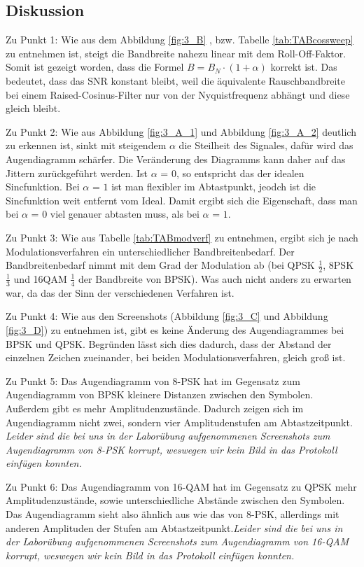\documentclass[12pt,a4paper,ngerman]{article}
\begin{document}
\subsection{Diskussion}
Zu Punkt 1: Wie aus dem Abbildung \ref{fig:3_B} , bzw. Tabelle \ref{tab:TABcossweep} zu entnehmen ist, steigt die Bandbreite nahezu linear mit dem Roll-Off-Faktor. Somit ist gezeigt worden, dass die Formel $B = B_N\cdot(1+\alpha)$ korrekt ist. Das bedeutet, dass das SNR konstant bleibt, weil die äquivalente Rauschbandbreite bei einem Raised-Cosinus-Filter nur von der Nyquistfrequenz abhängt und diese gleich bleibt.

Zu Punkt 2: Wie aus Abbildung \ref{fig:3_A_1} und Abbildung \ref{fig:3_A_2} deutlich zu erkennen ist, sinkt mit steigendem $\alpha$ die Steilheit des Signales, dafür wird das Augendiagramm schärfer. Die Veränderung des Diagramms kann daher auf das Jittern zurückgeführt werden. Ist $\alpha$ = $0$, so entspricht das der idealen Sincfunktion. Bei $\alpha$ = $1$ ist man flexibler im Abtastpunkt, jeodch ist die Sincfunktion weit entfernt vom Ideal. Damit ergibt sich die Eigenschaft, dass man bei $\alpha$ = $0$ viel genauer abtasten muss, als bei $\alpha$ = $1$.

Zu Punkt 3: Wie aus Tabelle \ref{tab:TABmodverf} zu entnehmen, ergibt sich je nach Modulationsverfahren ein unterschiedlicher Bandbreitenbedarf. Der Bandbreitenbedarf nimmt mit dem Grad der Modulation ab (bei QPSK $\frac{1}{2}$, 8PSK $\frac{1}{3}$ und 16QAM $\frac{1}{4}$ der Bandbreite von BPSK). Was auch nicht anders zu erwarten war, da das der Sinn der verschiedenen Verfahren ist.

Zu Punkt 4: Wie aus den Screenshots (Abbildung \ref{fig:3_C} und Abbildung \ref{fig:3_D}) zu entnehmen ist, gibt es keine Änderung des Augendiagrammes bei BPSK und QPSK. Begründen lässt sich dies dadurch, dass der Abstand der einzelnen Zeichen zueinander, bei beiden Modulationsverfahren, gleich groß ist.

Zu Punkt 5: Das Augendiagramm von 8-PSK hat im Gegensatz zum Augendiagramm von BPSK kleinere Distanzen zwischen den Symbolen. Außerdem gibt es mehr Amplitudenzustände. Dadurch zeigen sich im Augendiagramm nicht zwei, sondern vier Amplitudenstufen am Abtastzeitpunkt. \emph{Leider sind die bei uns in der Laborübung aufgenommenen Screenshots zum Augendiagramm von 8-PSK korrupt, weswegen wir kein Bild in das Protokoll einfügen konnten.}

Zu Punkt 6: Das Augendiagramm von 16-QAM hat im Gegensatz zu QPSK mehr Amplitudenzustände, sowie unterschiedliche Abstände zwischen den Symbolen. Das Augendiagramm sieht also ähnlich aus wie das von 8-PSK, allerdings mit anderen Amplituden der Stufen am Abtastzeitpunkt.\emph{Leider sind die bei uns in der Laborübung aufgenommenen Screenshots zum Augendiagramm von 16-QAM korrupt, weswegen wir kein Bild in das Protokoll einfügen konnten.}\\
\end{document}
